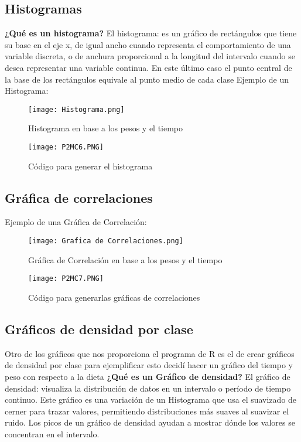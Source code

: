 \documentclass{article}
\begin{document}
\subsection{Histogramas}
\textbf{¿Qué es un histograma?}
\newline
El histograma: es un gráfico de rectángulos que tiene su base en el eje x, de igual ancho cuando representa el comportamiento de una variable discreta, o de anchura proporcional a la longitud del intervalo cuando se desea representar una variable continua. En
este último caso el punto central de la base de los rectángulos equivale al punto medio de cada clase
\newline
Ejemplo de un Histograma:
\begin{figure}[h]
    \centering
    \texttt{[image: Histograma.png]}
    \caption{Histograma en base a los pesos y el tiempo }
    \label{fig:mesh6}
\end{figure}

\newpage
\begin{figure}[h]
    \centering
    \texttt{[image: P2MC6.PNG]}
    \caption{Código para generar el histograma }
    \label{fig:mesh7}
\end{figure}

\subsection{Gráfica de correlaciones}
Ejemplo de una Gráfica de Correlación:
\begin{figure}[h]
    \centering
    \texttt{[image: Grafica de Correlaciones.png]}
    \caption{Gráfica de Correlación en base a los pesos y el tiempo }
    \label{fig:mesh8}
\end{figure}
\begin{figure}[h]
    \centering
    \texttt{[image: P2MC7.PNG]}
    \caption{Código para generarlas gráficas de correlaciones  }
    \label{fig:mesh9}
\end{figure}

\subsection{Gráficos de densidad por clase}
Otro de los gráficos que nos proporciona el programa de R es el de crear gráficos de densidad por clase para ejemplificar esto decidí hacer un gráfico del tiempo y peso con respecto a la dieta
\newpage
{}
\textbf{¿Qué es un Gráfico de densidad?}
\newline
El gráfico de densidad: visualiza la distribución de datos en un intervalo o período de tiempo continuo. Este gráfico es una variación de un Histograma que usa el suavizado de cerner para trazar valores, permitiendo distribuciones más suaves al suavizar el ruido. Los picos de un gráfico de densidad ayudan a mostrar dónde los valores se concentran en el intervalo.
\end{document}
